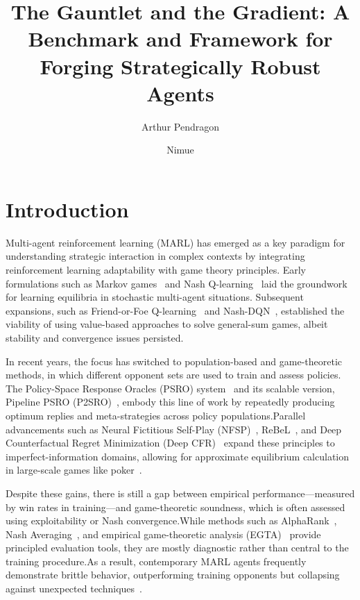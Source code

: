 \documentclass[sigconf,anonymous]{aamas}
\title[The Gauntlet and the Gradient]{The Gauntlet and the Gradient: A Benchmark and Framework for Forging Strategically Robust Agents}
\author{Arthur Pendragon}
\affiliation{
  \institution{Camelot Castle}
  \city{Camelot}
  \country{United Kingdom}}
\author{Nimue}
\affiliation{
  \institution{The Lady's Lake}
  \city{Avalon}
  \country{United Kingdom}}
\begin{document}

\pagestyle{fancy}
\fancyhead{}


\maketitle 

\section{Introduction}

Multi-agent reinforcement learning (MARL) has emerged as a key paradigm for understanding strategic interaction in complex contexts by integrating reinforcement learning adaptability with game theory principles. Early formulations such as Markov games~\cite{Littman1994} and Nash Q-learning~\cite{Hu2003} laid the groundwork for learning equilibria in stochastic multi-agent situations. Subsequent expansions, such as Friend-or-Foe Q-learning~\cite{Littman2001} and Nash-DQN~\cite{Casgrain2019}, established the viability of using value-based approaches to solve general-sum games, albeit stability and convergence issues persisted.

In recent years, the focus has switched to population-based and game-theoretic methods, in which different opponent sets are used to train and assess policies. The Policy-Space Response Oracles (PSRO) system~\cite{Lanctot2017} and its scalable version, Pipeline PSRO (P2SRO)~\cite{McAleer2020}, embody this line of work by repeatedly producing optimum replies and meta-strategies across policy populations.Parallel advancements such as Neural Fictitious Self-Play (NFSP)~\cite{Heinrich2016}, ReBeL~\cite{Brown2020}, and Deep Counterfactual Regret Minimization (Deep CFR)~\cite{Brown2018DeepCF} expand these principles to imperfect-information domains, allowing for approximate equilibrium calculation in large-scale games like poker~\cite{Brown2019Science}.

Despite these gains, there is still a gap between empirical performance—measured by win rates in training—and game-theoretic soundness, which is often assessed using exploitability or Nash convergence.While methods such as AlphaRank~\cite{Omidshafiei2019}, Nash Averaging~\cite{Balduzzi2018}, and empirical game-theoretic analysis (EGTA)~\cite{Wellman2006} provide principled evaluation tools, they are mostly diagnostic rather than central to the training procedure.As a result, contemporary MARL agents frequently demonstrate brittle behavior, outperforming training opponents but collapsing against unexpected techniques~\cite{Panait2005,Xu2023}.
\end{document}
